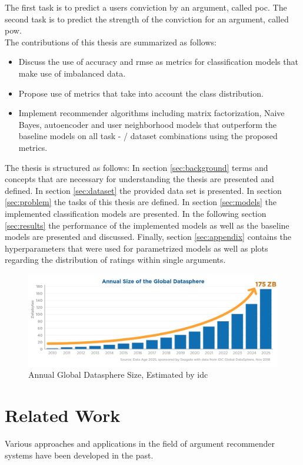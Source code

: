 The first task is to predict a users conviction by an argument, called \acrfull{poc}. The second task is to predict the strength of the conviction for an argument, called \acrfull{pow}.\\
The contributions of this thesis are summarized as follows:
\begin{itemize}
    \item Discuss the use of accuracy and \acrshort{rmse} as metrics for classification models that make use of imbalanced data.
    \item Propose use of metrics that take into account the class distribution.
    \item Implement recommender algorithms including matrix factorization, Naive Bayes, autoencoder and user neighborhood models that outperform the baseline models on all task - / dataset combinations using the proposed metrics.
 \end{itemize}
The thesis is structured as follows: In section \ref{sec:background} terms and concepts that are necessary for understanding the thesis are presented and defined. In section \ref{sec:dataset} the provided data set is presented. In section \ref{sec:problem} the tasks of this thesis are defined. In section \ref{sec:models} the implemented classification models are presented. In the following section \ref{sec:results} the performance of the implemented models as well as the baseline models are presented and discussed. Finally, section \ref{sec:appendix} contains the hyperparameters that were used for parametrized models as well as plots regarding the distribution of ratings within single arguments.  

\begin{figure}[t]
    \centering
    \includegraphics[width=1\textwidth]{images/annual_datasphere_growth.jpg}
    \caption{Annual Global Datasphere Size, Estimated by \acrshort{idc}}
    \label{fig:datasphere_growth}
\end{figure}

\section{Related Work}
Various approaches and applications in the field of argument recommender systems have been developed in the past.

